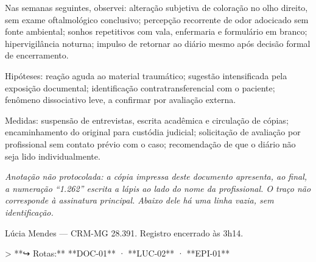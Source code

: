 \noindent Nas semanas seguintes, observei: alteração subjetiva de coloração no olho direito, sem exame oftalmológico conclusivo; percepção recorrente de odor adocicado sem fonte ambiental; sonhos repetitivos com vala, enfermaria e formulário em branco; hipervigilância noturna; impulso de retornar ao diário mesmo após decisão formal de encerramento.

\noindent Hipóteses: reação aguda ao material traumático; sugestão intensificada pela exposição documental; identificação contratransferencial com o paciente; fenômeno dissociativo leve, a confirmar por avaliação externa.

\noindent Medidas: suspensão de entrevistas, escrita acadêmica e circulação de cópias; encaminhamento do original para custódia judicial; solicitação de avaliação por profissional sem contato prévio com o caso; recomendação de que o diário não seja lido individualmente.

\noindent \textit{Anotação não protocolada: a cópia impressa deste documento apresenta, ao final, a numeração ``1.262'' escrita a lápis ao lado do nome da profissional. O traço não corresponde à assinatura principal. Abaixo dele há uma linha vazia, sem identificação.}

\noindent Lúcia Mendes --- CRM-MG 28.391. Registro encerrado às 3h14.

> **↪ Rotas:** **DOC-01** · **LUC-02** · **EPI-01**

